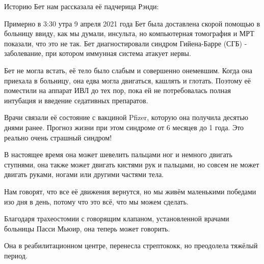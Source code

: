 Историю Бет нам рассказала её падчерица Рэнди:

Примерно в 3:30 утра 9 апреля 2021 года Бет была доставлена скорой помощью в
больницу ввиду, как мы думали, инсульта, но компьютерная томография и МРТ
показали, что это не так. Бет диагностировали синдром Гийена-Барре (СГБ) -
заболевание, при котором иммунная система атакует нервы.

Бет не могла встать, её тело было слабым и совершенно онемевшим. Когда она
приехала в больницу, она едва могла двигаться, кашлять и глотать. Поэтому её
поместили на аппарат ИВЛ до тех пор, пока ей не потребовалась полная интубация и
введение седативных препаратов.

Врачи связали её состояние с вакциной Pfizer, которую она получила десятью днями
ранее. Прогноз жизни при этом синдроме от 6 месяцев до 1 года. Это реально очень
страшный синдром!

В настоящее время она может шевелить пальцами ног и немного двигать ступнями,
она также может двигать кистями рук и пальцами, но совсем не может двигать
руками, ногами или другими частями тела.

Нам говорят, что все её движения вернутся, но мы живём маленькими победами изо
дня в день, потому что это всё, что мы можем сделать.

Благодаря трахеостомии с говорящим клапаном, установленной врачами больницы
Пасси Мьюир, она теперь может говорить.

Она в реабилитационном центре, перенесла стрептококк, но преодолела тяжёлый
период.

